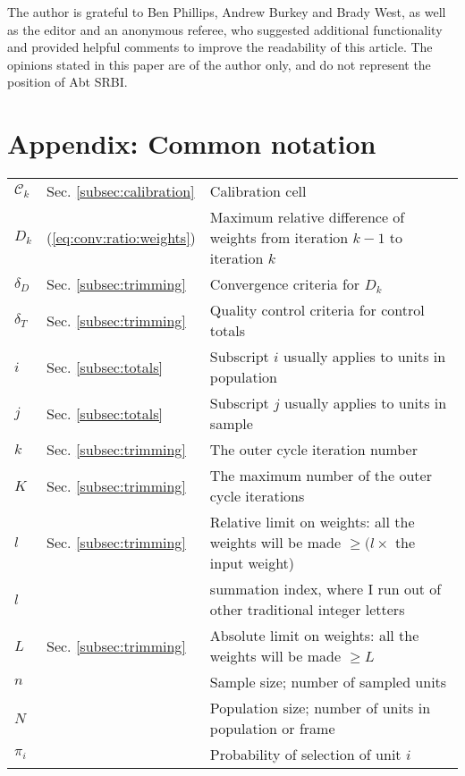 The author is grateful to Ben Phillips, Andrew Burkey and Brady West,
as well as the editor and an anonymous referee,
who suggested additional functionality and provided helpful comments
to improve the readability of this article. The opinions stated in this paper
are of the author only, and do not represent the position of Abt SRBI.


% 


\appendix

\section*{Appendix: Common notation}

\begin{tabular}{llp{9.5cm}}
    $\mathcal{C}_k$ & Sec. \ref{subsec:calibration} & Calibration cell \\
    $D_k$ & (\ref{eq:conv:ratio:weights}) & Maximum relative difference of weights 
            from iteration $k-1$ to iteration $k$ \\
    $\delta_D$ & Sec. \ref{subsec:trimming} & Convergence criteria for $D_k$ \\
    $\delta_T$ & Sec. \ref{subsec:trimming} & Quality control criteria for control totals \\
    $i$ & Sec. \ref{subsec:totals} & Subscript $i$ usually applies to units in population \\
    $j$ & Sec. \ref{subsec:totals} & Subscript $j$ usually applies to units in sample \\
    $k$ & Sec. \ref{subsec:trimming} & The outer cycle iteration number \\
    $K$ & Sec. \ref{subsec:trimming} & The maximum number of the outer cycle iterations \\
    $l$ & Sec. \ref{subsec:trimming} & Relative limit on weights: all the weights will be made
        $\ge (l \times$ the input weight) \\
    $l$ & & summation index, where I run out of other traditional integer letters \\
    $L$ & Sec. \ref{subsec:trimming} & Absolute limit on weights: all the weights will be made 
        $\ge L$ \\
    $n$ & & Sample size; number of sampled units \\
    $N$ & & Population size; number of units in population or frame \\
    $\pi_i$ & & Probability of selection of unit $i$

\end{tabular}
